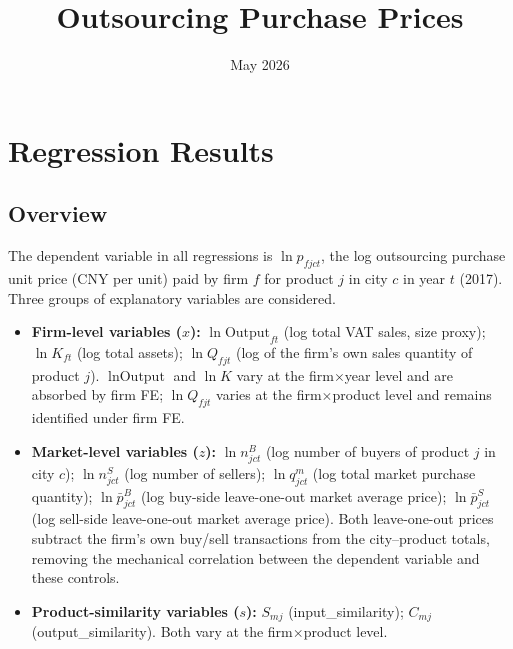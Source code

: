 \documentclass[12pt]{article}
\title{\textbf{Outsourcing Purchase Prices}}
\date{May 2026}
\begin{document}
\maketitle

\section{Regression Results}
\label{sec:regression}

\subsection*{Overview}

The dependent variable in all regressions is
\(\ln p_{fjct}\), the log outsourcing purchase unit price (CNY per unit)
paid by firm \(f\) for product \(j\) in city \(c\) in year \(t\) (2017).
Three groups of explanatory variables are considered.

\begin{itemize}[leftmargin=1.5em]
  \item \textbf{Firm-level variables (\(x\)):}
    \(\ln\text{Output}_{ft}\) (log total VAT sales, size proxy);
    \(\ln K_{ft}\) (log total assets);
    \(\ln Q_{fjt}\) (log of the firm's own sales quantity of product
    \(j\)).
    \(\ln\text{Output}\) and \(\ln K\) vary at the firm\(\times\)year level
    and are absorbed by firm FE; \(\ln Q_{fjt}\) varies at the
    firm\(\times\)product level and remains identified under firm FE.

  \item \textbf{Market-level variables (\(z\)):}
    \(\ln n^{B}_{jct}\) (log number of buyers of product \(j\) in city \(c\));
    \(\ln n^{S}_{jct}\) (log number of sellers);
    \(\ln q^{m}_{jct}\) (log total market purchase quantity);
    \(\ln \bar{p}^{B}_{jct}\) (log buy-side leave-one-out market average price);
    \(\ln \bar{p}^{S}_{jct}\) (log sell-side leave-one-out market average price).
    Both leave-one-out prices subtract the firm's own buy/sell transactions
    from the city--product totals, removing the mechanical correlation between
    the dependent variable and these controls.

  \item \textbf{Product-similarity variables (\(s\)):}
    \(S_{mj}\) (input\_similarity); \(C_{mj}\) (output\_similarity). Both vary at the firm\(\times\)product level.
\end{itemize}
\end{document}
